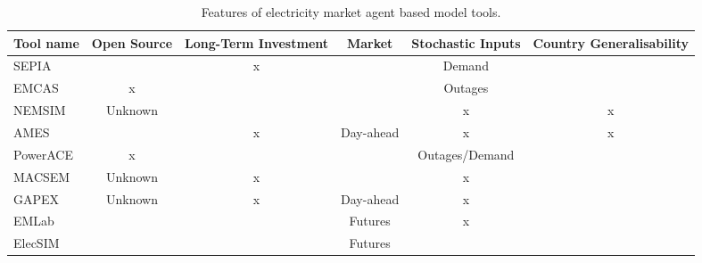 \begin{table*}[]
	\begin{tabular}{|l|c|c|c|c|c|}
		\hline
		\multicolumn{1}{|c|}{\textbf{Tool name}} & \textbf{Open Source} & \textbf{Long-Term Investment} & \textbf{Market} & \textbf{Stochastic Inputs} & \textbf{Country Generalisability} \\ \hline
		SEPIA                                    & \checkmark           & x                             & \checkmark      & Demand                     & \checkmark                        \\ \hline
		EMCAS                                    & x                    & \checkmark                    & \checkmark      & Outages                    & \checkmark                        \\ \hline
		NEMSIM                                   & Unknown              & \checkmark                    & \checkmark      & x                          & x                                 \\ \hline
		AMES                                     & \checkmark           & x                             & Day-ahead       & x                          & x                                 \\ \hline
		PowerACE                                 & x                    & \checkmark                    & \checkmark      & Outages/Demand             & \checkmark                        \\ \hline
		MACSEM                                   & Unknown              & x                             & \checkmark      & x                          & \checkmark                        \\ \hline
		GAPEX                                    & Unknown              & x                             & Day-ahead       & x                          & \checkmark                        \\ \hline
		EMLab                                    & \checkmark           & \checkmark                    & Futures         & x                          & \checkmark                        \\ \hline
		ElecSIM                                  & \checkmark           & \checkmark                    & Futures         & \checkmark                 & \checkmark                        \\ \hline
	\end{tabular}
	\caption{Features of electricity market agent based model tools.}
	\label{table:tool_comparison}
\end{table*}


